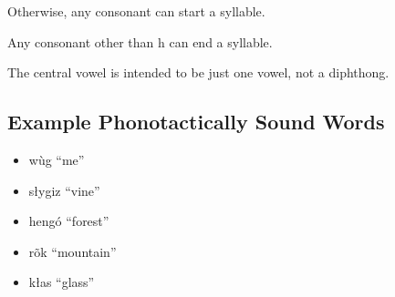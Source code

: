 Otherwise, any consonant can start a syllable.

Any consonant other than h can end a syllable.

The central vowel is intended to be just one vowel, not a diphthong.

\subsection{Example Phonotactically Sound Words}\label{subsec:example-phonotactically-sound-words}
\begin{itemize}
    \item wùg  ``me''
    \item słygiz  ``vine''
    \item hengó  ``forest''
    \item rõk  ``mountain''
    \item kłas  ``glass''
\end{itemize}